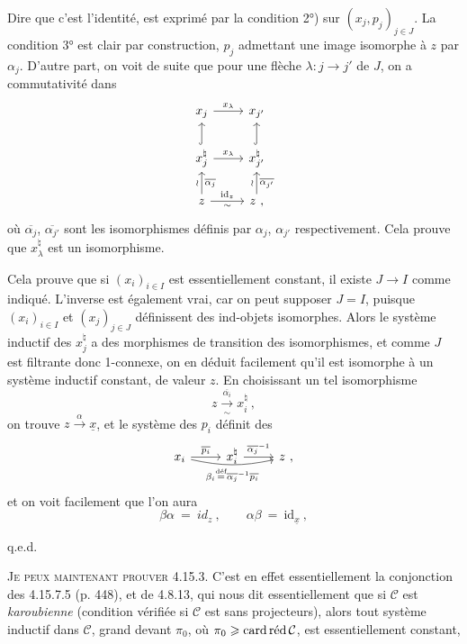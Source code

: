 
Dire que c'est l'identité, est exprimé par la condition 2°) sur $(x_j,p_j)_{j\in J}$. La condition 3° est clair par construction, $p_j$ admettant une image isomorphe à $z$ par $\alpha_j$. D'autre part, on voit de suite que pour une flèche $\lambda : j \longrightarrow j'$ de $J$, on a commutativité dans %
\[
\begin{tikzcd}
x_j \arrow[r, "x_\lambda"] & x_{j'} \\
x_j^\natural \arrow[u, hook] \arrow[r, "x_\lambda"] & x_{j'}^\natural \arrow[u, hook] \\
z \arrow[u, "\wr", "\overline{\alpha_j}"'] \arrow[r, "\mathrm{id}_z", "\sim"'] & z \ , \arrow[u, "\wr", "\overline{\alpha_{j'}}"']
\end{tikzcd}
\]
où $\overline{\alpha_j}$, $\overline{\alpha_{j'}}$ sont les isomorphismes définis par $\alpha_j$, $\alpha_{j'}$ respectivement. Cela prouve que $x_\lambda^\natural$ est un isomorphisme.

Cela prouve que si $(x_i)_{i\in I}$ est essentiellement constant, il existe $J\longrightarrow I$ comme indiqué. L'inverse est également vrai, car on peut supposer $J = I$, puisque $(x_i)_{i\in I}$ et $(x_j)_{j\in J}$ définissent des ind-objets isomorphes. Alors le système inductif des $x_j^\natural$ a des morphismes de transition des isomorphismes, et comme $J$ est filtrante donc 1-connexe, on en déduit facilement qu'il est isomorphe
à un système inductif constant, de valeur $z$. En choisissant un tel isomorphisme
\[
z \xrightarrow[\sim]{\overline{\alpha_i}} x_i^\natural \ ,
\]
on trouve $z \xrightarrow{\alpha} \underline{x}$, et le système des $p_i$ définit des
\[
\begin{tikzcd}
x_i \arrow[r, "\overline{p_i}"] \arrow[rr, bend right=12, "\beta_i \overset{\text{déf}}{=} \overline{\alpha_j}^{-1}\overline{p_i}"'] & x_i^\natural \arrow[r, "\overline{\alpha_j}^{-1}"] & z \ ,
\end{tikzcd}
\] %
et on voit facilement que l'on aura
\[
\beta\alpha \ = \ id_z \ , \qquad \alpha\beta \ = \ \mathrm{id}_{\underline{x}} \ ,
\]

\hfill q.e.d.

\textsc{Je peux maintenant prouver} 4.15.3. C'est en effet essentiellement la conjonction des 4.15.7.5 (p. 448), et de 4.8.13, qui nous dit essentiellement que si $\mathcal{C}$ est \textit{karoubienne} (condition vérifiée si $\mathcal{C}$ est sans projecteurs), alors tout système inductif dans $\mathcal{C}$, grand devant $\pi_0$, où $\pi_0 \geqslant \mathrm{card}\,\text{réd}\,\mathcal{C}$, est essentiellement constant,

